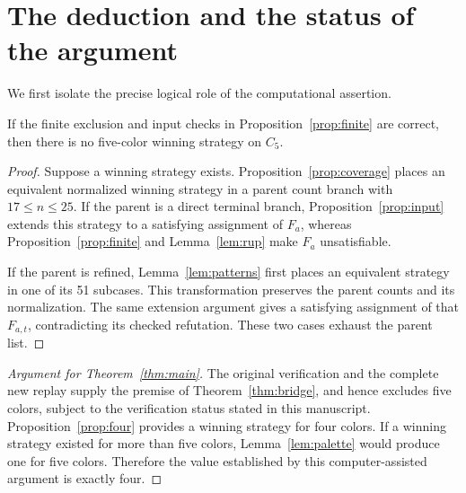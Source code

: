\section{The deduction and the status of the argument}\label{sec:conclusion}
We first isolate the precise logical role of the computational assertion.

\begin{theorem}\label{thm:bridge}
If the finite exclusion and input checks in
Proposition~\ref{prop:finite} are correct, then there is no five-color
winning strategy on $C_5$.
\end{theorem}
\begin{proof}
Suppose a winning strategy exists. Proposition~\ref{prop:coverage}
places an equivalent normalized winning strategy in a parent count branch
with $17\leq n\leq25$. If the parent is a direct terminal branch,
Proposition~\ref{prop:input} extends this strategy to a satisfying
assignment of $F_a$, whereas Proposition~\ref{prop:finite} and
Lemma~\ref{lem:rup} make $F_a$ unsatisfiable.

If the parent is refined, Lemma~\ref{lem:patterns} first places an
equivalent strategy in one of its 51 subcases. This transformation
preserves the parent counts and its normalization. The same extension
argument gives a satisfying assignment of that $F_{a,t}$, contradicting
its checked refutation. These two cases exhaust the parent list.
\end{proof}

\begin{proof}[Argument for Theorem~\ref{thm:main}]
The original verification and the complete new replay supply the premise of
Theorem~\ref{thm:bridge}, and hence excludes five colors, subject to the
verification status stated in this manuscript. Proposition~\ref{prop:four}
provides a winning strategy for four colors. If a winning strategy existed
for more than five colors, Lemma~\ref{lem:palette} would produce one for
five colors. Therefore the value established by this computer-assisted
argument is exactly four.
\end{proof}

